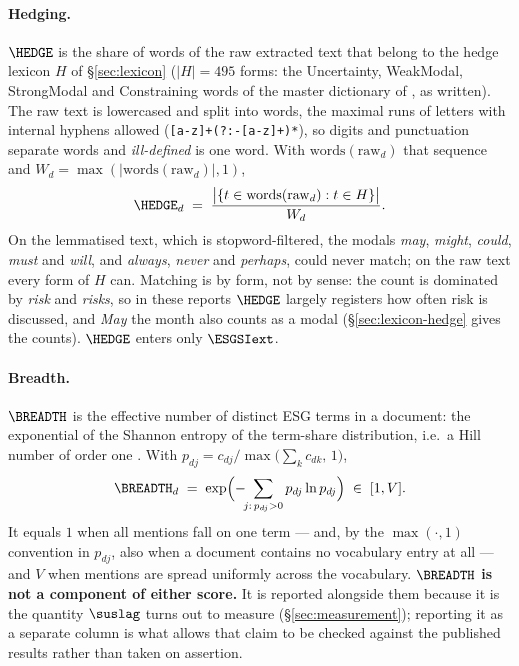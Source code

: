 \paragraph{Hedging.} $\HEDGE$ is the share of words of the raw extracted
text that belong to the hedge lexicon $H$ of \S\ref{sec:lexicon}
($|H| = 495$ forms: the Uncertainty, WeakModal, StrongModal and
Constraining words of the master dictionary of \citealp{loughran2011}, as written).
The raw text is lowercased and split into words, the maximal runs of letters
with internal hyphens allowed (\texttt{[a-z]+(?:-[a-z]+)*}), so digits and
punctuation separate words and \emph{ill-defined} is one word. With
$\mathrm{words}(\mathrm{raw}_d)$ that sequence and
$W_d = \max(|\mathrm{words}(\mathrm{raw}_d)|, 1)$,
\begin{equation}
\label{eq:hedge}
\HEDGE_d \;=\; \frac{\bigl|\{t \in \mathrm{words}(\mathrm{raw}_d) : t \in H\}\bigr|}{W_d}.
\end{equation}
On the lemmatised text, which is stopword-filtered, the modals \emph{may},
\emph{might}, \emph{could}, \emph{must} and \emph{will}, and \emph{always},
\emph{never} and \emph{perhaps}, could never match; on the raw text every
form of $H$ can. Matching is by form, not by sense: the count is dominated by
\emph{risk} and \emph{risks}, so in these reports $\HEDGE$ largely registers
how often risk is discussed, and \emph{May} the month also counts as a modal
(\S\ref{sec:lexicon-hedge} gives the counts). $\HEDGE$ enters only
$\ESGSIext$.

\paragraph{Breadth.} $\BREADTH$ is the effective number of distinct ESG terms
in a document: the exponential of the Shannon entropy of the term-share
distribution, i.e.\ a Hill number of order one \citep{hill1973}. With
$p_{dj} = c_{dj} / \max\bigl(\sum_{k} c_{dk},\, 1\bigr)$,
\begin{equation}
\label{eq:breadth}
\BREADTH_d \;=\; \exp\Bigl(-\!\!\sum_{j:\,p_{dj}>0} p_{dj} \ln p_{dj}\Bigr)
\;\in\; [1, V].
\end{equation}
It equals $1$ when all mentions fall on one term --- and, by the
$\max(\cdot,1)$ convention in $p_{dj}$, also when a document contains no
vocabulary entry at all --- and $V$ when mentions are spread uniformly across
the vocabulary. \textbf{$\BREADTH$ is not a component of
either score.} It is reported alongside them because it is the quantity
$\suslag$ turns out to measure (\S\ref{sec:measurement}); reporting it as a
separate column is what allows that claim to be checked against the published
results rather than taken on assertion.

